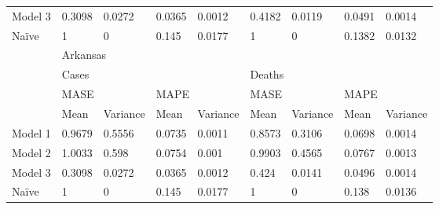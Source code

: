 \begin{table}[h]
\begin{tabular}{|l|llll|llll|}
Model 3 & 0.3098                    & 0.0272                        & 0.0365                    & 0.0012   & 0.4182                    & 0.0119                        & 0.0491                    & 0.0014    \\
Na\"ive   & 1                         & 0                             & 0.145                     & 0.0177   & 1                         & 0                             & 0.1382                    & 0.0132    \\ 
\hline
        & \multicolumn{8}{l|}{Arkansas}                                                                                                                                                                        \\ 
\cline{2-9}
        & \multicolumn{4}{l|}{Cases}                                                                       & \multicolumn{4}{l|}{Deaths}                                                                       \\ 
\cline{2-9}
        & \multicolumn{2}{l|}{MASE}                                 & \multicolumn{2}{l|}{MAPE}            & \multicolumn{2}{l|}{MASE}                                 & \multicolumn{2}{l|}{MAPE}             \\ 
\cline{2-9}
        & \multicolumn{1}{l|}{Mean} & \multicolumn{1}{l|}{Variance} & \multicolumn{1}{l|}{Mean} & Variance & \multicolumn{1}{l|}{Mean} & \multicolumn{1}{l|}{Variance} & \multicolumn{1}{l|}{Mean} & Variance  \\ 
\hline
Model 1 & 0.9679                    & 0.5556                        & 0.0735                    & 0.0011   & 0.8573                    & 0.3106                        & 0.0698                    & 0.0014    \\
Model 2 & 1.0033                    & 0.598                         & 0.0754                    & 0.001    & 0.9903                    & 0.4565                        & 0.0767                    & 0.0013    \\
Model 3 & 0.3098                    & 0.0272                        & 0.0365                    & 0.0012   & 0.424                     & 0.0141                        & 0.0496                    & 0.0014    \\
Na\"ive   & 1                         & 0                             & 0.145                     & 0.0177   & 1                         & 0                             & 0.138                     & 0.0136    \\
\hline
\end{tabular}
\end{table}


